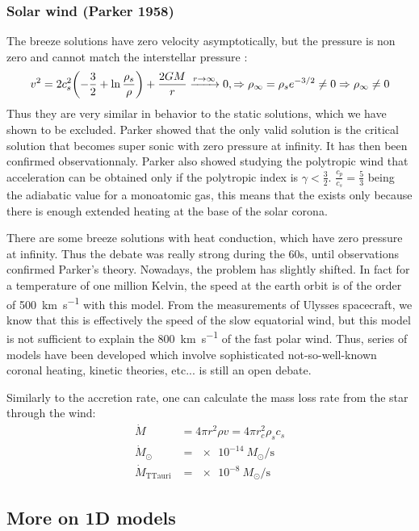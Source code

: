 \documentclass[10pt,a4paper,english,draft]{article}
\let\originalleft\left
\let\originalright\right
\renewcommand{\left}{\mathopen{}\mathclose\bgroup\originalleft}
\renewcommand{\right}{\aftergroup\egroup\originalright}
\begin{document}
\subsubsection{Solar wind (Parker 1958)}
The breeze solutions have zero velocity asymptotically, but the pressure is non zero and cannot match the interstellar pressure :
\begin{equation}
  v^2 = 2 c_s^2 \left( -\frac{3}{2} + \ln \frac{\rho_s}{\rho} \right) + \frac{2GM}{r} \xrightarrow{r\to\infty} 0,\Rightarrow \rho_\infty = \rho_s e^{-3/2} \neq 0 \Rightarrow \rho_\infty \neq 0
\end{equation}
Thus they are very similar in behavior to the static solutions, which we have shown to be excluded. Parker showed that the only valid solution is the critical solution that becomes super sonic with zero pressure at infinity. It has then been confirmed observationnaly. Parker also showed studying the polytropic wind that acceleration can be obtained only if the polytropic index is $\gamma < \frac{3}{2}$. $\frac{c_p}{c_s} = \frac{5}{3}$ being the adiabatic value for a monoatomic gas, this means that the exists only because there is enough extended heating at the base of the solar corona.

There are some breeze solutions with heat conduction, which have zero pressure at infinity. Thus the debate was really strong during the 60s, until observations confirmed Parker's theory. Nowadays, the problem has slightly shifted. In fact for a temperature of one million Kelvin, the speed at the earth orbit is of the order of \SI{500}{\km\per\s} with this model. From the measurements of Ulysses spacecraft, we know that this is effectively the speed of the slow equatorial wind, but this model is not sufficient to explain the \SI{800}{\km\per\s} of the fast polar wind. Thus, series of models have been developed which involve sophisticated not-so-well-known coronal heating, kinetic theories, etc... is still an open debate.

Similarly to the accretion rate, one can calculate the mass loss rate from the star through the wind:
\begin{align}
  \dot{M} & = 4\pi r^2\rho v = 4\pi r^2_c\rho_sc_s \\
  \dot{M}_\odot & = \SI{e-14}{M_\odot\per\s} \\
  \dot{M}_\mathrm{TTauri} &= \SI{e-8}{M_\odot\per\s}
\end{align}

\subsection{More on 1D models}
\end{document}
